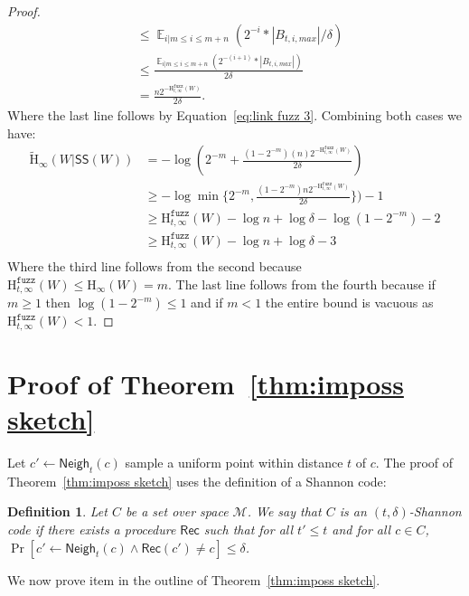 \documentclass[11pt]{article}
\newcommand{\thref}[1]{\mbox{Theorem~\ref{#1}}}
\DeclareMathOperator*{\expe}{\mathbb{E}}
\newcommand{\class}[1]{{\ensuremath{\mathsf{#1}}}}
\newcommand{\sketch}{\ensuremath{\class{SS}}\xspace}
\newcommand{\rec}{\ensuremath{\class{Rec}}\xspace}
\newcommand{\neigh}{\ensuremath{\class{Neigh}}\xspace}
\newcommand{\Hoo}{\mathrm{H}_\infty}
\newcommand{\Hav}{\tilde{\mathrm{H}}_\infty}
\newcommand{\Hfuzz}{\mathrm{H}^{\mathtt{fuzz}}_{t,\infty}}
\newtheorem{definition}[theorem]{Definition}
\begin{document}
\begin{proof}
\begin{align*}
&\le \expe_{i | m\le i \le m+n} \left(2^{-i}*|B_{t, i, max}|/\delta\right)\\
&\le\frac{ \expe_{i | m\le i \le m+n} \left(2^{-(i+1)}*|B_{t, i, max}|\right)}{2\delta}\\
&= \frac{n 2^{-\Hfuzz(W)}}{2\delta}.
\end{align*}
Where the last line follows by Equation~\eqref{eq:link fuzz 3}.
Combining both cases we have:
\begin{align*}
\Hav(W | \sketch(W)) &= -\log \left(2^{-m}+\frac{(1-2^{-m})(n)2^{-\Hfuzz(W)}}{2\delta}\right)\\
&\ge -\log \min\{2^{-m}, \frac{(1-2^{-m}) n2^{-\Hfuzz(W)}}{2\delta}\})-1\\
&\ge \Hfuzz(W) - \log n + \log \delta - \log (1-2^{-m}) - 2\\
&\ge \Hfuzz(W) - \log n + \log \delta - 3\\
\end{align*}
Where the third line follows from the second because $\Hfuzz(W)\le \Hoo(W) = m$. The last line follows from the fourth because if $m\ge 1$ then $\log (1-2^{-m})\le 1$ and if $m< 1$ the entire bound is vacuous as $\Hfuzz(W)< 1$.
\end{proof}

\section{Proof of \thref{thm:imposs sketch}}
\label{sec:proof secure sketch imposs}
Let $c'\leftarrow \neigh_t(c)$ sample a uniform point within distance $t$ of $c$.  
The proof of \thref{thm:imposs sketch} uses the definition of a Shannon code: 
\begin{definition}
\label{def:shannon-code}
Let $C$ be a set over space $\mathcal{M}$.  We say that $C$ is an $(t,\delta)$-\emph{Shannon code} if there exists a procedure $\rec$ such that for all $t'\le t$ and for all $c\in C$, $\Pr[c'\leftarrow \neigh_t(c) \wedge \rec(c') \neq c]\le \delta$. %
\end{definition}

\noindent
We now prove item in the outline of \thref{thm:imposs sketch}.
\end{document}
